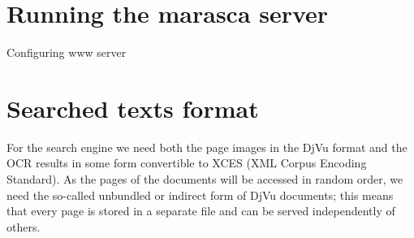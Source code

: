 \documentclass{article}
\begin{document}
\section{Running the marasca server}
\label{sec:runn-marasca-serv}

Configuring www server

\section{Searched texts format}
\label{sec:search-text-format}

For the search engine we need both the page images in the DjVu format
and the OCR results in some form convertible to XCES (XML Corpus
Encoding Standard). As the pages of the documents will be accessed in
random order, we need the so-called unbundled or indirect form of DjVu
documents; this means that every page is stored in a separate file and
can be served independently of others.
\end{document}
